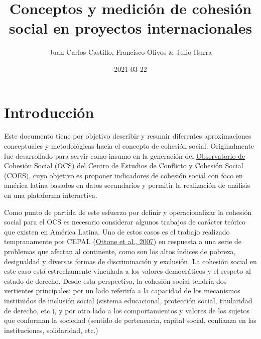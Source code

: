 \documentclass[
  12pt,
]{book}
\title{Conceptos y medición de cohesión social en proyectos internacionales}
\author{Juan Carlos Castillo, Francisco Olivos \& Julio Iturra}
\date{2021-03-22}
\begin{document}
\maketitle

{
\hypersetup{linkcolor=}
\setcounter{tocdepth}{1}
\tableofcontents
}
\listoftables
\listoffigures
{}
\hypertarget{introducciuxf3n}{%
\chapter*{Introducción}\label{introducciuxf3n}}

Este documento tiene por objetivo describir y resumir diferentes aproximaciones conceptuales y metodológicas hacia el concepto de cohesión social. Originalmente fue desarrollado para servir como insumo en la generación del \href{https://ocs-coes.netlify.app/}{Observatorio de Cohesión Social (OCS)} del Centro de Estudios de Conflicto y Cohesión Social (COES), cuyo objetivo es proponer indicadores de cohesión social con foco en américa latina basados en datos secundarios y permitir la realización de análisis en una plataforma interactiva.

Como punto de partida de este esfuerzo por definir y operacionalizar la cohesión social para el OCS es necesario considerar algunos trabajos de carácter teórico que existen en América Latina. Uno de estos casos es el trabajo realizado tempranamente por CEPAL (\protect\hyperlink{ref-ottone2007cohesion}{Ottone et al., 2007}) en respuesta a una serie de problemas que afectan al continente, como son los altos índices de pobreza, desigualdad y diversas formas de discriminación y exclusión. La cohesión social en este caso está estrechamente vinculada a los valores democráticos y el respeto al estado de derecho. Desde esta perspectiva, la cohesión social tendría dos vertientes principales: por un lado referiría a la capacidad de los mecanismos instituidos de inclusión social (sistema educacional, protección social, titularidad de derecho, etc.), y por otro lado a los comportamientos y valores de los sujetos que conforman la sociedad (sentido de pertenencia, capital social, confianza en las instituciones, solidaridad, etc.)
\end{document}
